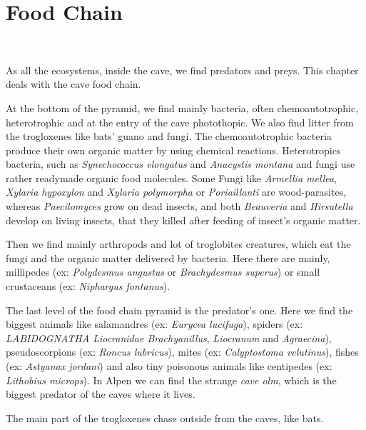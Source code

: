 \documentclass[draft, final]{report}
\begin{document}
\chapter{Food Chain}
~\par
As all  the ecosystems, inside the cave, we find predators and preys. This chapter deals with the cave food chain. \\
\par
At the bottom of the pyramid, we find mainly bacteria, often chemoautotrophic, heterotrophic and at the entry of the cave photothopic. We also find litter from the trogloxenes like bats’ guano and fungi. The chemoautotrophic bacteria produce their own organic matter by using chemical reactions. Heterotropics bacteria, such as \emph{Synechococcus elongatus} and \emph{Anacystis montana}  and fungi use rather readymade organic food molecules. Some Fungi like \emph{Armellia mellea}, \emph{Xylaria hypoxylon} and \emph{Xylaria polymorpha} or \emph{Poriaillanti} are wood-parasites, whereas \emph{Paecilomyces} grow on dead insects, and both \emph{Beauveria} and \emph{Hirsutella} develop on living insects, that they killed after feeding of insect’s organic matter. \\
\par
Then we find mainly arthropods and lot of troglobites creatures, which eat the fungi and the organic matter delivered by bacteria. Here there are mainly, millipedes (ex: \emph{Polydesmus angustus} or \emph{Brachydesmus superus}) or small crustaceans (ex: \emph{Niphargus fontanus}). \\
\par
The last level of the food chain pyramid is the predator’s one. Here we find the biggest animals like salamandres (ex: \emph{Eurycea lucifuga}), spiders (ex: \emph{LABIDOGNATHA Liocranidae Brachyanillus}, \emph{Liocranum} and \emph{Agraecina}), pseudoscorpions (ex: \emph{Roncus lubricus}), mites (ex: \emph{Calyptostoma velutinus}), fishes (ex: \emph{Astyanax jordani}) and also tiny poisonous animals like centipedes (ex:\emph{ Lithobius microps}). In Alpen we can find the strange \emph{cave olm}, which is the biggest predator of the caves where it lives. \\
\par
The main part of the trogloxenes chase outside from the caves, like bats.
\end{document}
